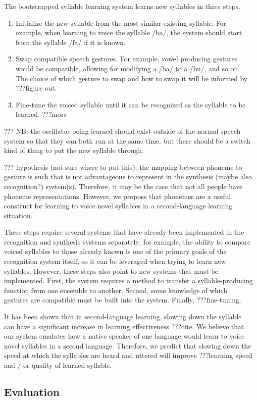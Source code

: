The bootstrapped syllable learning system
learns new syllables in three steps.

\begin{enumerate}
\item Initialize the new syllable from the most
  similar existing syllable.
  For example, when learning to voice
  the syllable /ba/, the system should
  start from the syllable /fa/ if it is known.
\item Swap compatible speech gestures.
  For example, vowel producing gestures
  would be compatible, allowing for modifying
  a /ba/ to a /bu/, and so on.
  The choice of which gesture to swap and
  how to swap it will be informed by
  ???figure out.
\item Fine-tune the voiced syllable
  until it can be recognized as the
  syllable to be learned.
  ???more
\end{enumerate}

??? NB: the oscillator being learned should exist outside of
the normal speech system so that they can both run
at the same time, but there should be a switch kind of thing
to put the new syllable through.

??? hypothesis (not sure where to put this):
the mapping between phoneme to gesture
is such that is not advantageous
to represent in the synthesis
(maybe also recognition?) system(s).
Therefore, it may be the case that
not all people have phoneme representations.
However, we propose that phonemes
are a useful construct for learning to voice
novel syllables in a second-language learning situation.

These steps require several systems
that have already been implemented
in the recognition and synthesis systems separately;
for example, the ability to compare
voiced syllables to those already known
is one of the primary goals of the recognition system itself,
so it can be leveraged when trying to learn new syllables.
However, these steps also point to new systems
that must be implemented.
First, the system requires a method
to transfer a syllable-producing function
from one ensemble to another.
Second, some knowledge of which gestures
are compatible must be built into the system.
Finally, ???fine-tuning.

It has been shown that in second-language learning,
slowing down the syllable can have
a significant increase in learning effectiveness
???cite.
We believe that our system emulates
how a native speaker of one language
would learn to voice novel syllables in a second language.
Therefore, we predict that slowing down
the speed at which the syllables are heard
and uttered will improve ???learning speed
and / or quality of learned syllable.

\subsection{Evaluation}
